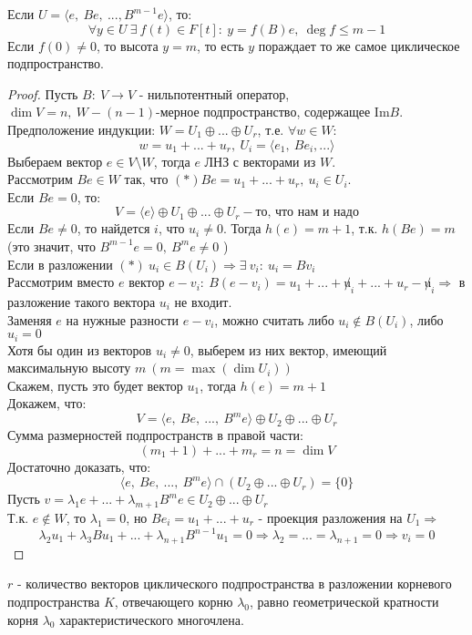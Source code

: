     \begin{lemma}
        Если $U = \langle e, \ Be,\ ...,B^{m-1}e \rangle$, то:
        $$\forall y \in U \ \exists \ f(t) \in F[t]: \ y = f(B)e, \ \deg f \leq m-1$$
        Если $f(0) \neq 0$, то высота $y = m$, то есть $y$ пораждает то же самое циклическое подпространство.     
    \end{lemma}
    \begin{proof}
        Пусть $B: \ V \to V$ - нильпотентный оператор, \\ $\dim V = n, \ W - (n-1)$-мерное подпространство, содержащее $\text{Im}B$.\\ Предположение индукции: $W = U_1 \oplus ... \oplus U_r$, т.е. $\forall w \in W$:
        $$w = u_1+... +u_r, \ U_i = \langle e_1, \ Be_i,... \rangle$$
        Выбераем вектор $e \in V\setminus W$, тогда $e$ ЛНЗ с векторами из $W$.\\
        Рассмотрим $Be \in W$ так, что $(*)Be = u_1 + ... + u_r, \ u_i \in U_i$. \\
        Если $Be = 0$, то:
        $$V = \langle e \rangle \oplus U_1 \oplus ... \oplus U_r - \text{то, что нам и надо}$$
        Если $Be \neq 0$, то найдется $i$, что $u_i \neq 0$. Тогда $h(e) = m+1$, т.к. $h(Be) = m$ \\
        (это значит, что $B^{m-1}e = 0, \ B^me \neq 0$ )\\
        Если в разложении $(*) \ u_i \in B(U_i) \Longrightarrow \exists \ v_i: \ u_i = Bv_i$\\
        Рассмотрим вместо $e$ вектор $e-v_i: \ B(e-v_i) = u_1 + ... + \not u_i+...+u_r - \not u_i \Longrightarrow $ в разложение такого вектора $u_i$ не входит.\\
        Заменяя $e$ на нужные разности $e-v_i$, можно считать либо $u_i \not \in B(U_i)$, либо $u_i = 0$  \\
        Хотя бы один из векторов $u_i \neq 0$, выберем из них вектор, имеющий максимальную высоту $m \ (m=\max (\dim U_i))$ \\
        Скажем, пусть это будет вектор $u_1$, тогда $h(e) = m+1$\\
        Докажем, что:
        $$V = \langle e, \ Be, \ ..., \ B^me \rangle \oplus U_2 \oplus ... \oplus U_r$$
        Сумма размерностей подпространств в правой части: 
        $$(m_1+1)+...+m_r = n = \dim V$$
        Достаточно доказать, что: 
        $$\langle e, \ Be, \ ..., \ B^me \rangle \cap (U_2 \oplus ... \oplus U_r) = \{0\}$$
        Пусть $v = \lambda_1 e +...+ \lambda_{m+1}B^me \in U_2 \oplus ... \oplus U_r$ \\
        Т.к. $e \not \in W$, то $\lambda_1 = 0$, но $Be_i = u_1+...+u_r$ - проекция разложения на $U_1 \Longrightarrow $ $$\lambda_2u_1+\lambda_3Bu_1+...+\lambda_{n+1}B^{n-1}u_1 = 0 \Longrightarrow \lambda_2=...=\lambda_{n+1} = 0 \Longrightarrow v_i = 0$$
    \end{proof} 
    \begin{remark}
        $r$ - количество векторов циклического подпространства в разложении корневого подпространства $K$, отвечающего корню $\lambda_0$, равно геометрической кратности корня $\lambda_0$ характеристического многочлена.    
    \end{remark}

